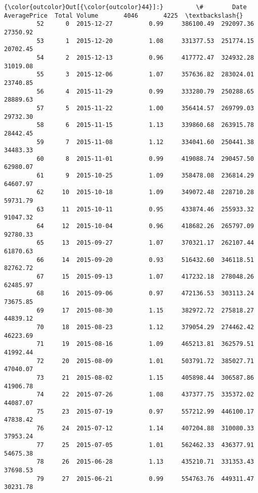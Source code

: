 \documentclass[11pt]{article}
\begin{document}
\begin{Verbatim}[commandchars=\\\{\}]
{\color{outcolor}Out[{\color{outcolor}44}]:}         \#        Date  AveragePrice  Total Volume       4046       4225  \textbackslash{}
         52      0  2015-12-27          0.99     386100.49  292097.36   27350.92   
         53      1  2015-12-20          1.08     331377.53  251774.15   20702.45   
         54      2  2015-12-13          0.96     417772.47  324932.28   31019.08   
         55      3  2015-12-06          1.07     357636.82  283024.01   23740.85   
         56      4  2015-11-29          0.99     333280.79  250288.65   28889.63   
         57      5  2015-11-22          1.00     356414.57  269799.03   29732.30   
         58      6  2015-11-15          1.13     339860.68  263915.78   28442.45   
         59      7  2015-11-08          1.12     334041.60  250441.38   34483.33   
         60      8  2015-11-01          0.99     419088.74  290457.50   62980.07   
         61      9  2015-10-25          1.09     358478.08  236814.29   64607.97   
         62     10  2015-10-18          1.09     349072.48  228710.28   59731.79   
         63     11  2015-10-11          0.95     433874.46  255933.32   91047.32   
         64     12  2015-10-04          0.96     418682.26  265797.09   92780.33   
         65     13  2015-09-27          1.07     370321.17  262107.44   61870.63   
         66     14  2015-09-20          0.93     516432.60  346118.51   82762.72   
         67     15  2015-09-13          1.07     417232.18  278048.26   62485.97   
         68     16  2015-09-06          0.97     472136.53  303113.24   73675.85   
         69     17  2015-08-30          1.15     382972.72  275818.27   44839.12   
         70     18  2015-08-23          1.12     379054.29  274462.42   46223.69   
         71     19  2015-08-16          1.09     465213.81  362579.51   41992.44   
         72     20  2015-08-09          1.01     503791.72  385027.71   47040.07   
         73     21  2015-08-02          1.15     405898.44  306587.86   41906.78   
         74     22  2015-07-26          1.08     437377.75  335372.02   44087.07   
         75     23  2015-07-19          0.97     557212.99  446100.17   47838.42   
         76     24  2015-07-12          1.14     407204.88  310080.33   37953.24   
         77     25  2015-07-05          1.01     562462.33  436377.91   54675.38   
         78     26  2015-06-28          1.13     435210.71  331353.43   37698.53   
         79     27  2015-06-21          0.99     554763.76  449311.47   30231.78   

\end{Verbatim}
\end{document}
